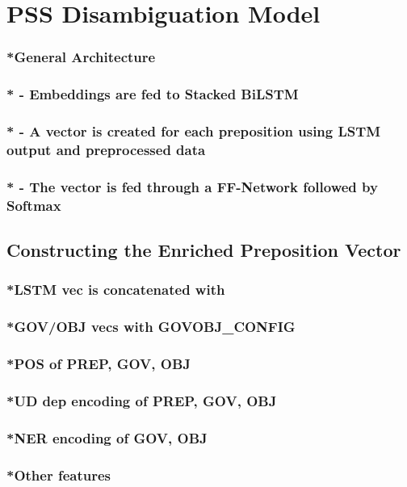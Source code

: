 \section{PSS Disambiguation Model} \label{sec:pssdisambg}
\subsubsection{*General Architecture}
\subsubsection{* - Embeddings are fed to Stacked BiLSTM}
\subsubsection{* - A vector is created for each preposition using LSTM output and preprocessed data}
\subsubsection{* - The vector is fed through a FF-Network followed by Softmax}
\pagebreak
\subsection{Constructing the Enriched Preposition Vector}
\subsubsection{*LSTM vec is concatenated with}
\subsubsection{*GOV/OBJ vecs with GOVOBJ\_CONFIG}
\subsubsection{*POS of PREP, GOV, OBJ}
\subsubsection{*UD dep encoding of PREP, GOV, OBJ}
\subsubsection{*NER encoding of GOV, OBJ}
\subsubsection{*Other features}

